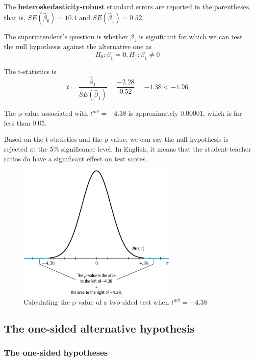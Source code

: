 \documentclass[a4paper,11pt]{article}
\begin{document}
\begin{itemize}
The \textbf{heteroskedasticity-robust} standard errors are reported in the
parentheses, that is, \(SE(\hat{\beta}_0) = 10.4\) and
\(SE(\hat{\beta}_1) = 0.52\). 

The superintendent's question is whether \(\beta_1\) is significant for
which we can test the null hypothesis against the alternative one as
\[ H_0: \beta_1 = 0, H_1: \beta_1 \neq 0 \]

The t-statistics is
\[ t = \frac{\hat{\beta}_1}{SE(\hat{\beta}_1)} = \frac{-2.28}{0.52}
= -4.38 < -1.96 \] 

The p-value associated with \(t^{act} = -4.38\) is approximately
0.00001, which is far less than 0.05. 

Based on the t-statistics and the p-value, we can say the null
hypothesis is rejected at the 5\% significance level. In English, it
means that the student-teacher ratios do have a significant effect on
test scores. 

\begin{figure}[htbp]
\centering
\includegraphics[width=0.7\textwidth]{figure/fig-5-1.png}
\caption{\label{fig:orgcc1cb6c}
Calculating the p-value of a two-sided test when \(t^{act}=-4.38\)}
\end{figure}
\end{itemize}


\subsection{The one-sided alternative hypothesis}
\label{sec:org7015080}

\subsubsection*{The one-sided hypotheses}
\label{sec:org690826f}
\end{document}
